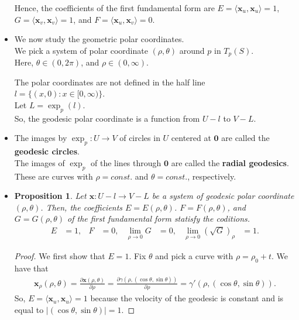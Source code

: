\documentclass[10pt]{article}
\newtheorem{proposition}[lemma]{Proposition}
\newcommand{\ve}[1]{\mathbf{#1}}
\newcommand{\ra}{\rightarrow}
\begin{document}
\begin{itemize}
    Hence, the coefficients of the first fundamental form are $E = \langle \ve{x}_u, \ve{x}_u \rangle = 1$, $G = \langle \ve{x}_v, \ve{x}_v \rangle = 1$, and $F = \langle \ve{x}_u, \ve{x}_v \rangle = 0.$

    \item We now study the geometric polar coordinates.\\
    We pick a system of polar coordinate $(\rho, \theta)$ around $p$ in $T_p(S)$.\\
    Here, $\theta \in (0, 2\pi)$, and $\rho \in (0, \infty)$.

    The polar coordinates are not defined in the half line $l = \{ (x, 0) : x \in [0, \infty) \}$.\\
    Let $L = \exp_p(l)$.\\
    So, the geodesic polar coordinate is a function from $U-l$ to $V - L$.

    \item The images by $\exp_p: U \ra V$ of circles in $U$ centered at $\ve{0}$ are called the {\bf geodesic circles}.\\
    The images of $\exp_p$ of the lines through $\ve{0}$ are called the {\bf radial geodesics}.\\
    These are curves with $\rho = const.$ and $\theta = const.$, respectively.

    \item \begin{proposition}
      Let $\ve{x} : U - l \ra V - L$ be a system of geodesic polar coordinate $(\rho, \theta)$. Then, the coefficients $E = E(\rho, \theta)$. $F = F(\rho,\theta)$, and $G = G(\rho, \theta)$ of the first fundamental form statisfy the coditions.
      \begin{align*}
        E &= 1, & F &= 0, & \lim_{\rho \ra 0} G &= 0, & \lim_{\rho \ra 0} (\sqrt{G})_\rho &= 1.
      \end{align*}
    \end{proposition}
    \begin{proof}
      We first show that $E = 1$. Fix $\theta$ and pick a curve with $\rho = \rho_0 + t$. We have that
      \begin{align*}
        \ve{x}_\rho(\rho, \theta) = \frac{\partial \ve{x}(\rho,\theta)}{\partial \rho} = \frac{\partial \gamma(\rho,(\cos \theta, \sin\theta))}{\partial \rho} = \gamma'(\rho, (\cos\theta, \sin\theta)).
      \end{align*}
      So, $E = \langle \ve{x}_u, \ve{x}_u \rangle = 1$ because the velocity of the geodesic is constant and is equal to $|(\cos\theta, \sin\theta)| = 1$.


\end{proof}
\end{itemize}
\end{document}
